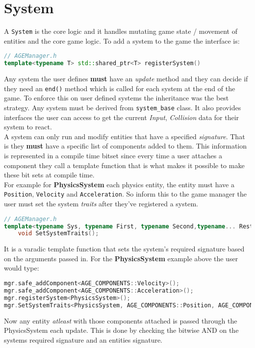 \documentclass[16pt,a4paper]{article}
\begin{document}
\section{System}
A \texttt{System} is the core logic and it handles mutating game state / movement of entities and the core game logic. To add a system to the game the interface is: 
\begin{lstlisting}[language=c++]
// AGEManager.h
template<typename T> std::shared_ptr<T> registerSystem()
\end{lstlisting}
Any system the user defines \textbf{must} have an \textit{update} method and they can decide if they need an \texttt{end()} method which is called for each system at the end of the game. To enforce this on user defined systems the inheritance was the best strategy. Any system must be derived from \texttt{system\_base} class. It also provides interfaces the user can access to get the current \textit{Input}, \textit{Collision} data for their system to react.
\\
A system can only run and modify entities that have a specified \textit{signature}. That is they \textbf{must} have a specific list of components added to them. This information is represented in a compile time bitset since every time a user attaches a component they call a template function that is what makes it possible to make these bit sets at compile time. 
\\
For example for \textbf{PhysicsSystem} each physics entity, the entity must have a \texttt{Position}, \texttt{Velocity} and \texttt{Acceleration}. So inform this to the game manager the user must set the system \textit{traits} after they've registered a system. 
\begin{lstlisting}[language=c++]
// AGEManager.h
template<typename Sys, typename First, typename Second,typename... Rest>
    void SetSystemTraits();  
\end{lstlisting}
It is a varadic template function that sets the system's required signature based on the arguments passed in. For the \textbf{PhysicsSystem} example above the user would type:
\begin{lstlisting}[language=c++]
mgr.safe_addComponent<AGE_COMPONENTS::Velocity>();
mgr.safe_addComponent<AGE_COMPONENTS::Acceleration>();
mgr.registerSystem<PhysicsSystem>();
mgr.SetSystemTraits<PhysicsSystem, AGE_COMPONENTS::Position, AGE_COMPONENTS::Velocity, AGE_COMPONENTS::Acceleration>();  
\end{lstlisting}
Now any entity \textit{atleast} with those components attached is passed through the PhysicsSystem each update. This is done by checking the bitwise AND on the systems required signature and an entities signature. 
\end{document}
